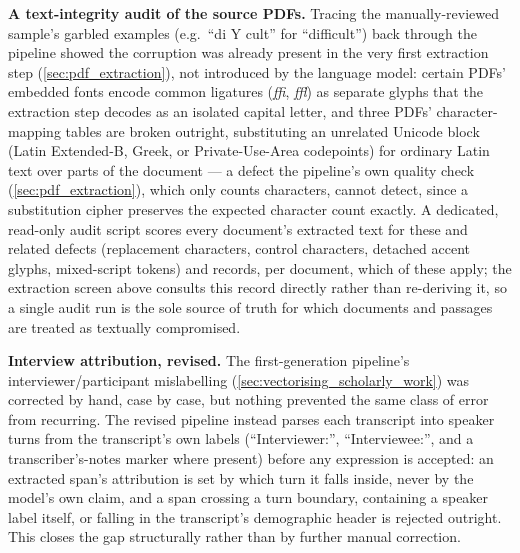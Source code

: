\textbf{A text-integrity audit of the source PDFs.} Tracing the manually-reviewed sample's garbled examples (e.g.\ \enquote{di Y cult} for \enquote{difficult}) back through the pipeline showed the corruption was already present in the very first extraction step (\ref{sec:pdf_extraction}), not introduced by the language model: certain PDFs' embedded fonts encode common ligatures (\textit{ffi}, \textit{ffl}) as separate glyphs that the extraction step decodes as an isolated capital letter, and three PDFs' character-mapping tables are broken outright, substituting an unrelated Unicode block (Latin Extended-B, Greek, or Private-Use-Area codepoints) for ordinary Latin text over parts of the document — a defect the pipeline's own quality check (\ref{sec:pdf_extraction}), which only counts characters, cannot detect, since a substitution cipher preserves the expected character count exactly. A dedicated, read-only audit script scores every document's extracted text for these and related defects (replacement characters, control characters, detached accent glyphs, mixed-script tokens) and records, per document, which of these apply; the extraction screen above consults this record directly rather than re-deriving it, so a single audit run is the sole source of truth for which documents and passages are treated as textually compromised.

\textbf{Interview attribution, revised.} The first-generation pipeline's interviewer/participant mislabelling (\ref{sec:vectorising_scholarly_work}) was corrected by hand, case by case, but nothing prevented the same class of error from recurring. The revised pipeline instead parses each transcript into speaker turns from the transcript's own labels (\enquote{Interviewer:}, \enquote{Interviewee:}, and a transcriber's-notes marker where present) before any expression is accepted: an extracted span's attribution is set by which turn it falls inside, never by the model's own claim, and a span crossing a turn boundary, containing a speaker label itself, or falling in the transcript's demographic header is rejected outright. This closes the gap structurally rather than by further manual correction.

